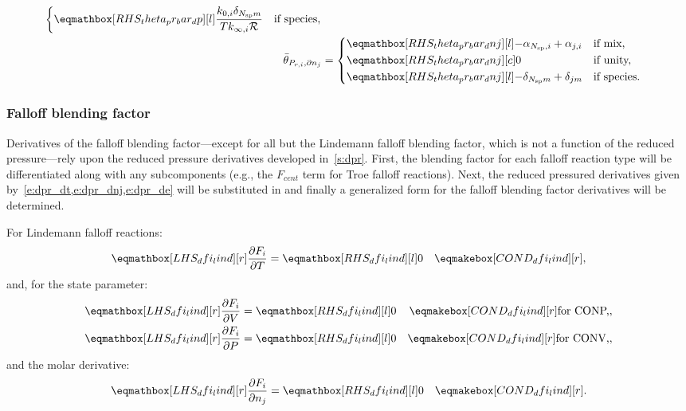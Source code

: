 \documentclass[12pt,number,sort&compress]{elsarticle}
\begin{document}
\begin{align}
\begin{dcases}
  \rhs{theta_pr_bar_dp}{\frac{k_{0, i} \delta_{\ns/ m}}{T k_{\infty, i} \Ru/}} & \text{if species,}
 \end{dcases} \\
 \label{e:dpr_theta_bar_dnj}
 \bar{\theta}_{P_{r, i}, \partial n_j} &=
 \begin{dcases}
  \rhs{theta_pr_bar_dnj}{- \alpha_{\ns/,i} + \alpha_{j,i}} & \text{if mix,} \\
  \rhs{theta_pr_bar_dnj}{0}[c] & \text{if unity,}  \\
  \rhs{theta_pr_bar_dnj}{- \delta_{\ns/ m} + \delta_{j m}} & \text{if species.}
 \end{dcases}
\end{align}


\subsubsection{Falloff blending factor}
\label{s:dfi}

Derivatives of the falloff blending factor---except for all but the Lindemann falloff blending factor, which is not a function of the reduced pressure---rely upon the reduced pressure derivatives developed in~\cref{s:dpr}.
First, the blending factor for each falloff reaction type will be differentiated along with any subcomponents (e.g., the $F_{cent}$ term for Troe falloff reactions).
Next, the reduced pressured derivatives given by~\cref{e:dpr_dt,e:dpr_dnj,e:dpr_de} will be substituted in and finally a generalized form for the falloff blending factor derivatives will be determined.

For Lindemann falloff reactions:
\begin{align}
 \lhs{dfi_lind}{\frac{\partial F_{i} }{\partial T }} &= \rhs{dfi_lind}{0} & \cond{dfi_lind}{,} \label{e:dfi_lind_dt} \\
\end{align}
and, for the state parameter:
\begin{subequations}
 \label{e:dfi_lind_de}
 \begin{align}
  \lhs{dfi_lind}{\frac{\partial F_{i} }{\partial V }} &= \rhs{dfi_lind}{0} & \cond{dfi_lind}{\dconp/,} \\
  \lhs{dfi_lind}{\frac{\partial F_{i} }{\partial P }} &= \rhs{dfi_lind}{0} & \cond{dfi_lind}{\dconv/,}
 \end{align}
\end{subequations}
and the molar derivative:
\begin{align}
 \lhs{dfi_lind}{\frac{\partial F_{i} }{\partial n_j }} &= \rhs{dfi_lind}{0} & \cond{dfi_lind}{.} \label{e:dfi_lind_dnj}
\end{align}
\end{document}
